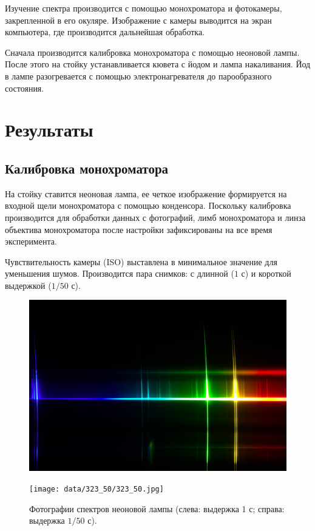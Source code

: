 \documentclass[12pt,a4paper]{article}
\begin{document}
	Изучение спектра производится с помощью монохроматора и фотокамеры, закрепленной в его окуляре. Изображение с камеры выводится на экран компьютера, где производится дальнейшая обработка.
	
	Сначала производится калибровка монохроматора с помощью неоновой лампы. После этого на стойку устанавливается кювета с йодом и лампа накаливания. Йод в лампе разогревается с помощью электронагревателя до парообразного состояния. 
	
	\section*{Результаты}
	
	\subsection*{Калибровка монохроматора}
	
	На стойку ставится неоновая лампа, ее четкое изображение формируется на входной щели монохроматора с помощью конденсора. Поскольку калибровка производится для обработки данных с фотографий, лимб монохроматора и линза объектива монохроматора после настройки зафиксированы на все время эксперимента. 
	
	Чувствительность камеры (ISO) выставлена в минимальное значение для уменьшения шумов. Производится пара снимков: с длинной ($1$ с) и короткой выдержкой ($1/50$ с).
	
	\begin{figure}[H]
		\centering
		\begin{minipage}{0.5\textwidth}
			\centering
			\includegraphics[width=0.9\linewidth]{data/323_1s/323_1s.jpg}
		\end{minipage}%
		\begin{minipage}{0.5\textwidth}
			\centering
			\texttt{[image: data/323\_50/323\_50.jpg]}
		\end{minipage}
		\caption{Фотографии спектров неоновой лампы (слева: выдержка 1 с; справа: выдержка $1/50$ с).}
		\label{fig:calibration_photo}
	\end{figure}
	
\end{document}
